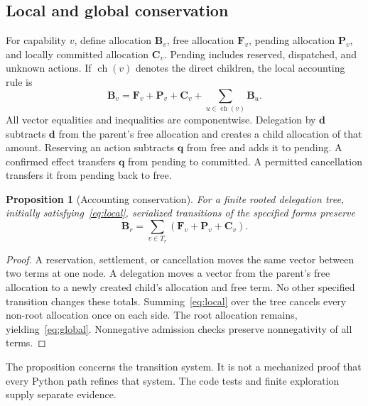 \documentclass[10pt,journal,a4paper]{IEEEtran}
\newtheorem{proposition}{Proposition}
\newcommand{\Budget}{\mathbf{B}}
\newcommand{\Free}{\mathbf{F}}
\newcommand{\Pending}{\mathbf{P}}
\newcommand{\Spent}{\mathbf{C}}
\newcommand{\Cost}{\mathbf{q}}
\begin{document}
\subsection{Local and global conservation}
For capability $v$, define allocation $\Budget_v$, free allocation $\Free_v$, pending allocation $\Pending_v$, and locally committed allocation $\Spent_v$. Pending includes reserved, dispatched, and unknown actions. If $\operatorname{ch}(v)$ denotes the direct children, the local accounting rule is
\begin{equation}
\Budget_v=\Free_v+\Pending_v+\Spent_v+
\sum_{u\in\operatorname{ch}(v)}\Budget_u .
\label{eq:local}
\end{equation}
All vector equalities and inequalities are componentwise. Delegation by $\mathbf d$ subtracts $\mathbf d$ from the parent's free allocation and creates a child allocation of that amount. Reserving an action subtracts $\Cost$ from free and adds it to pending. A confirmed effect transfers $\Cost$ from pending to committed. A permitted cancellation transfers it from pending back to free.

\begin{proposition}[Accounting conservation]
For a finite rooted delegation tree, initially satisfying~\eqref{eq:local}, serialized transitions of the specified forms preserve
\begin{equation}
\Budget_r=\sum_{v\in T_r}(\Free_v+\Pending_v+\Spent_v).
\label{eq:global}
\end{equation}
\end{proposition}
\begin{proof}
A reservation, settlement, or cancellation moves the same vector between two terms at one node. A delegation moves a vector from the parent's free allocation to a newly created child's allocation and free term. No other specified transition changes these totals. Summing~\eqref{eq:local} over the tree cancels every non-root allocation once on each side. The root allocation remains, yielding~\eqref{eq:global}. Nonnegative admission checks preserve nonnegativity of all terms.
\end{proof}

The proposition concerns the transition system. It is not a mechanized proof that every Python path refines that system. The code tests and finite exploration supply separate evidence.
\end{document}
